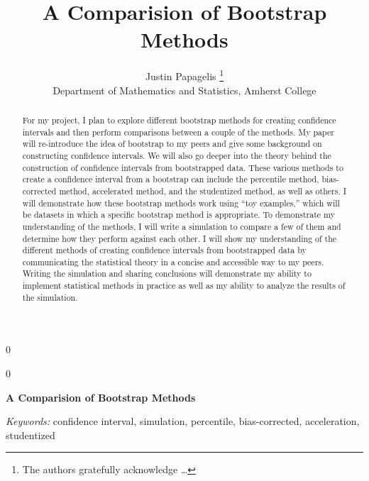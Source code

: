 \documentclass[12pt]{article}
\newcommand{\blind}{0}
\begin{document}
\def\spacingset#1{\renewcommand{\baselinestretch}%
{#1}\small\normalsize} \spacingset{1}



\blind
{
  \title{\bf A Comparision of Bootstrap Methods}

  \author{
        Justin Papagelis \thanks{The authors gratefully acknowledge
\ldots{}} \\
    Department of Mathematics and Statistics, Amherst College\\
      }
  \maketitle
} \fi

\blind
{
  \bigskip
  \bigskip
  \bigskip
  \begin{center}
    {\LARGE\bf A Comparision of Bootstrap Methods}
  \end{center}
  \medskip
} \fi

\bigskip
\begin{abstract}
For my project, I plan to explore different bootstrap methods for
creating confidence intervals and then perform comparisons between a
couple of the methods. My paper will re-introduce the idea of bootstrap
to my peers and give some background on constructing confidence
intervals. We will also go deeper into the theory behind the
construction of confidence intervals from bootstrapped data. These
various methods to create a confidence interval from a bootstrap can
include the percentile method, bias-corrected method, accelerated
method, and the studentized method, as well as others. I will
demonstrate how these bootstrap methods work using ``toy examples,''
which will be datasets in which a specific bootstrap method is
appropriate. To demonstrate my understanding of the methods, I will
write a simulation to compare a few of them and determine how they
perform against each other. I will show my understanding of the
different methods of creating confidence intervals from bootstrapped
data by communicating the statistical theory in a concise and accessible
way to my peers. Writing the simulation and sharing conclusions will
demonstrate my ability to implement statistical methods in practice as
well as my ability to analyze the results of the simulation.
\end{abstract}

\noindent%
{\it Keywords:} confidence
interval, simulation, percentile, bias-corrected, acceleration, studentized
\vfill
\end{document}
